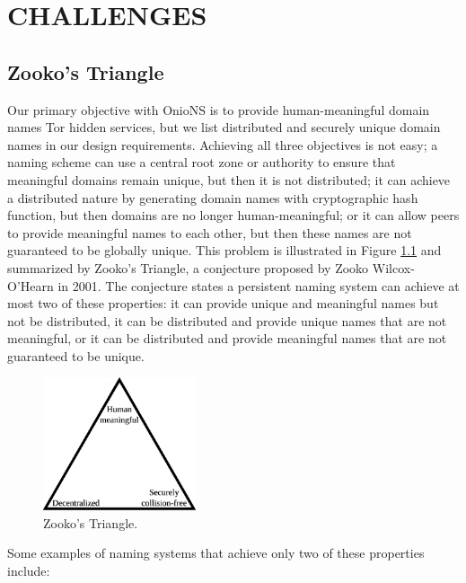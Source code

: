 
\chapter{CHALLENGES}

\section{Zooko's Triangle}
\label{sec:ZookosTriangle}

Our primary objective with OnioNS is to provide human-meaningful domain names Tor hidden services, but we list distributed and securely unique domain names in our design requirements. Achieving all three objectives is not easy; a naming scheme can use a central root zone or authority to ensure that meaningful domains remain unique, but then it is not distributed; it can achieve a distributed nature by generating domain names with cryptographic hash function, but then domains are no longer human-meaningful; or it can allow peers to provide meaningful names to each other, but then these names are not guaranteed to be globally unique. This problem is illustrated in Figure \ref{fig:ZookosTriangle} and summarized by Zooko's Triangle, a conjecture proposed by Zooko Wilcox-O'Hearn in 2001. The conjecture states a persistent naming system can achieve at most two of these properties: it can provide unique and meaningful names but not be distributed, it can be distributed and provide unique names that are not meaningful, or it can be distributed and provide meaningful names that are not guaranteed to be unique\cite{ferdous2009security}\cite{stiegler2005petname}.

\begin{figure}[htbp]
	\centering
	\includegraphics[width=0.4\textwidth]{images/Zooko.eps}
	\caption{Zooko's Triangle.}
	\label{fig:ZookosTriangle}
\end{figure}

Some examples of naming systems that achieve only two of these properties include:


